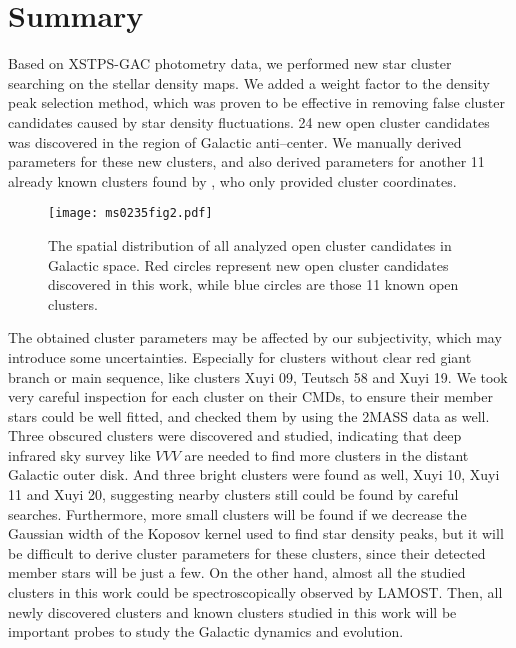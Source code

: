 \documentclass[]{raa_rb}
\begin{document}
\section{Summary}
Based on XSTPS-GAC photometry data, we performed new star cluster searching on the stellar density maps. We added a weight factor to the density peak selection method, which was proven to be effective in removing false cluster candidates caused by star density fluctuations. 24 new open cluster candidates was discovered in the region of Galactic anti--center.  We manually derived parameters for these new clusters, and also derived parameters for another 11 already known clusters found by \cite{Kronberger2006}, who only provided cluster coordinates. 

 \begin{figure}
 \begin{center}
 \texttt{[image: ms0235fig2.pdf]}
 \caption{The spatial distribution of all analyzed open cluster candidates in Galactic space. Red circles represent new open cluster candidates discovered in this work, while blue circles are those 11 known open clusters.} 
 \label{fig00}
 \end{center}
 \end{figure}

The obtained cluster parameters may be affected by our subjectivity, which may introduce some uncertainties. Especially for clusters without clear red giant branch or main sequence, like clusters Xuyi 09, Teutsch 58 and Xuyi 19. We took very careful inspection for each cluster on their CMDs, to ensure their member stars could be well fitted, and checked them by using the 2MASS data as well. Three obscured clusters were discovered and studied, indicating that deep infrared sky survey like $VVV$ are needed to find more clusters in the distant Galactic outer disk. And three bright clusters were found as well, Xuyi 10, Xuyi 11 and Xuyi 20, suggesting nearby clusters still could be found by careful searches. Furthermore, more small clusters will be found if we decrease the Gaussian width of the Koposov kernel used to find star density peaks, but it will be difficult to derive cluster parameters for these clusters, since their detected member stars will be just a few. 
On the other hand, almost all the studied clusters in this work could be spectroscopically observed by LAMOST. Then, all newly discovered clusters and known clusters studied in this work will be important probes to study the Galactic dynamics and evolution.  
\end{document}
